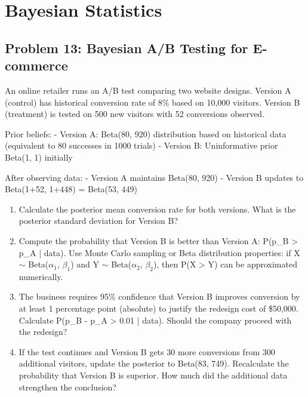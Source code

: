 \documentclass[12pt]{article}
\begin{document}

\section{Bayesian Statistics}

\subsection*{Problem 13: Bayesian A/B Testing for E-commerce}

An online retailer runs an A/B test comparing two website designs. Version A (control) has historical conversion rate of 8\% based on 10,000 visitors. Version B (treatment) is tested on 500 new visitors with 52 conversions observed.

Prior beliefs:
- Version A: Beta(80, 920) distribution based on historical data (equivalent to 80 successes in 1000 trials)
- Version B: Uninformative prior Beta(1, 1) initially

After observing data:
- Version A maintains Beta(80, 920)
- Version B updates to Beta(1+52, 1+448) = Beta(53, 449)

\begin{enumerate}[label=(\alph*)]
\item Calculate the posterior mean conversion rate for both versions. What is the posterior standard deviation for Version B?

\item Compute the probability that Version B is better than Version A: P(p\_B > p\_A | data). Use Monte Carlo sampling or Beta distribution properties: if X \(\sim\) Beta(\(\alpha_1\), \(\beta_1\)) and Y \(\sim\) Beta(\(\alpha_2\), \(\beta_2\)), then P(X > Y) can be approximated numerically.

\item The business requires 95\% confidence that Version B improves conversion by at least 1 percentage point (absolute) to justify the redesign cost of \$50,000. Calculate P(p\_B - p\_A > 0.01 | data). Should the company proceed with the redesign?

\item If the test continues and Version B gets 30 more conversions from 300 additional visitors, update the posterior to Beta(83, 749). Recalculate the probability that Version B is superior. How much did the additional data strengthen the conclusion?
\end{enumerate}
\end{document}
